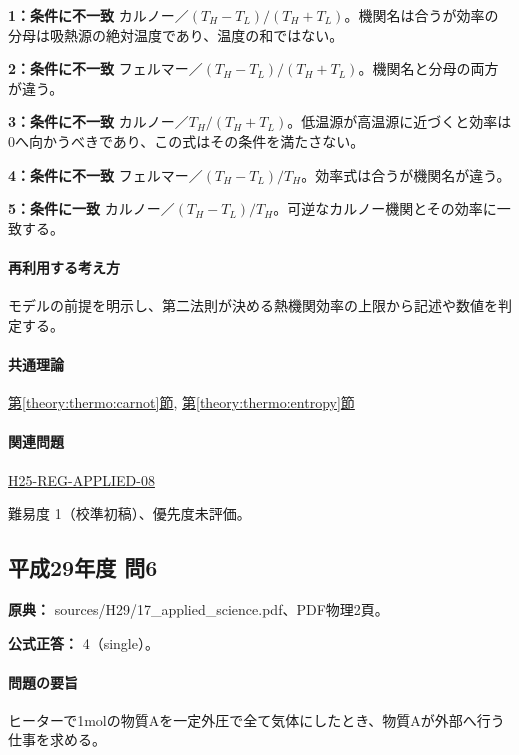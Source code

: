 \noindent\textbf{1：条件に不一致} カルノー／\((T_H-T_L)/(T_H+T_L)\)。機関名は合うが効率の分母は吸熱源の絶対温度であり、温度の和ではない。\par

\noindent\textbf{2：条件に不一致} フェルマー／\((T_H-T_L)/(T_H+T_L)\)。機関名と分母の両方が違う。\par

\noindent\textbf{3：条件に不一致} カルノー／\(T_H/(T_H+T_L)\)。低温源が高温源に近づくと効率は0へ向かうべきであり、この式はその条件を満たさない。\par

\noindent\textbf{4：条件に不一致} フェルマー／\((T_H-T_L)/T_H\)。効率式は合うが機関名が違う。\par

\noindent\textbf{5：条件に一致} カルノー／\((T_H-T_L)/T_H\)。可逆なカルノー機関とその効率に一致する。\par

\paragraph{再利用する考え方} モデルの前提を明示し、第二法則が決める熱機関効率の上限から記述や数値を判定する。

\paragraph{共通理論} \hyperref[theory:thermo:carnot]{第\ref*{theory:thermo:carnot}節}, \hyperref[theory:thermo:entropy]{第\ref*{theory:thermo:entropy}節}

\paragraph{関連問題} \hyperref[q:h25-reg-applied-08]{H25-REG-APPLIED-08}

\par 難易度 1（校準初稿）、優先度未評価。

\subsection{平成29年度 問6}
\label{q:h29-reg-applied-06}

\noindent\textbf{原典：} sources/H29/17\_applied\_science.pdf、PDF物理2頁。

\textbf{公式正答：} 4（single）。

\paragraph{問題の要旨} ヒーターで1molの物質Aを一定外圧で全て気体にしたとき、物質Aが外部へ行う仕事を求める。

